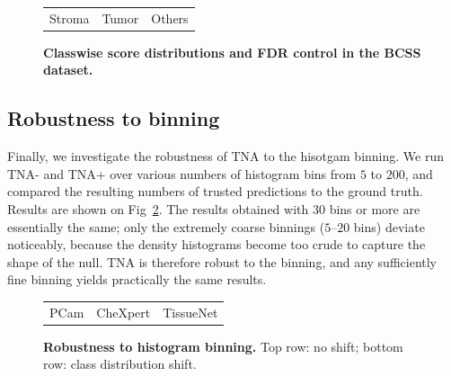 \documentclass[10pt,letterpaper]{article}
\newcommand{\edit}[1]{#1} %
\begin{document}
\begin{figure}[h!]
	\centering	
	\begin{tabular}{ccc}
		Stroma & Tumor & Others \\
	\end{tabular}
	\caption{{\bf Classwise score distributions and FDR control in the BCSS dataset.}}
	\label{fig:BCSS-classwise}
\end{figure}


\subsection*{Robustness to binning}
\edit{ Finally, we investigate the robustness of TNA to the hisotgam binning. We run TNA- and TNA+
over various numbers of histogram bins from $5$ to $200$, and compared the resulting numbers of trusted
predictions to the ground truth. Results are shown on Fig~\ref{fig:binning}. The results obtained with $30$ 
bins or more are essentially the same; only the extremely coarse binnings
($5$--$20$ bins) deviate noticeably, because the density histograms become
too crude to capture the shape of the null. TNA is therefore robust to the binning,
and any sufficiently fine binning yields practically the same results.
}

\begin{figure}[h!]
	\centering	
	\begin{tabular}{ccc}
		PCam & CheXpert & TissueNet \\
	\end{tabular}
	\caption{{\bf Robustness to histogram binning.} Top row: no shift; bottom row: class distribution shift.}
	\label{fig:binning}
\end{figure}
\end{document}
